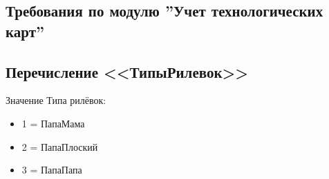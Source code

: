 \subsection{Требования по модулю ''Учет технологических карт''}
\label{sec:design}






\subsection{Перечисление <<ТипыРилевок>>}
\label{spr:ScoreType}

Значение Типа рилёвок:
\begin{itemize}
    \item 1 = ПапаМама
    \item 2 = ПапаПлоский
    \item 3 = ПапаПапа
\end{itemize}
